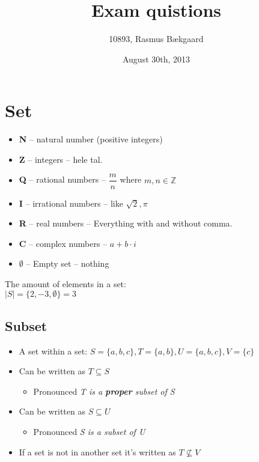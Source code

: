 \documentclass[english,10pt,a4paper]{article}
\title{Exam quistions}
\author{10893, Rasmus Bækgaard}
\date{August 30th, 2013}
\begin{document}
\maketitle

\section{Set}

\begin{theo}[Symbols] 

\begin{itemize}
\item \textbf{N} -- natural number (positive integers)
\item \textbf{Z} -- integers -- hele tal.
\item \textbf{Q} -- rational numbers -- $\dfrac{m}{n}$ where $m, n \in \mathbb{Z}$
\item \textbf{I} -- irrational numbers -- like $\sqrt{2}, \pi$
\item \textbf{R} -- real numbers -- Everything with and without comma.
\item \textbf{C} -- complex numbers -- $a+b\cdot i$
\item $\emptyset$ -- Empty set -- nothing
\end{itemize}

\end{theo}

\begin{theo} 
The amount of elements in a set:\\
$|S| = \{ 2, -3, \emptyset\} = 3$

\end{theo}




\subsection{Subset}
\begin{itemize}
\item A set within a set: $S=\{a, b, c\}, T = \{a, b \}, U= \{ a, b, c\}, V=\{c\}$
\item Can be written as $T \subseteq S$
	\begin{itemize}
	\item Pronounced \textit{T is a \textbf{proper} subset of S}
	\end{itemize}
\item Can be written as $S \subseteq U$
	\begin{itemize}
	\item Pronounced \textit{S is a subset of U}
	\end{itemize}
	
\item If a set is not in another set it's written as $T \not \subseteq V$
\end{itemize}
\end{document}
